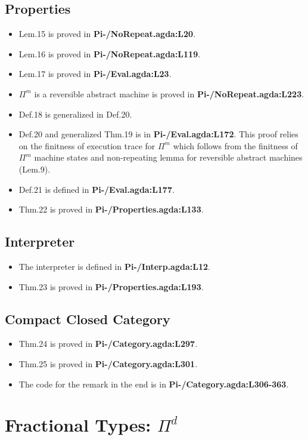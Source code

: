 \documentclass{article}
\begin{document}
\subsection{Properties}
\begin{itemize}
\item Lem.15 is proved in \textbf{Pi-/NoRepeat.agda:L20}.
\item Lem.16 is proved in \textbf{Pi-/NoRepeat.agda:L119}.
\item Lem.17 is proved in \textbf{Pi-/Eval.agda:L23}.
\item $\Pi^m$ is a reversible abstract machine is proved in \textbf{Pi-/NoRepeat.agda:L223}.
\item Def.18 is generalized in Def.20.
\item Def.20 and generalized Thm.19 is in \textbf{Pi-/Eval.agda:L172}. This proof relies on the finitness of execution trace
  for $\Pi^m$ which follows from the finitness of $\Pi^m$ machine states and non-repeating lemma for reversible abstract
  machines (Lem.9).
\item Def.21 is defined in \textbf{Pi-/Eval.agda:L177}.
\item Thm.22 is proved in \textbf{Pi-/Properties.agda:L133}.
\end{itemize}

\subsection{Interpreter}
\begin{itemize}
\item The interpreter is defined in \textbf{Pi-/Interp.agda:L12}.
\item Thm.23 is proved in \textbf{Pi-/Properties.agda:L193}.
\end{itemize}

\subsection{Compact Closed Category}
\begin{itemize}
\item Thm.24 is proved in \textbf{Pi-/Category.agda:L297}.
\item Thm.25 is proved in \textbf{Pi-/Category.agda:L301}.
\item The code for the remark in the end is in \textbf{Pi-/Category.agda:L306-363}.
\end{itemize}

\section{Fractional Types: $\Pi^d$}
\end{document}
